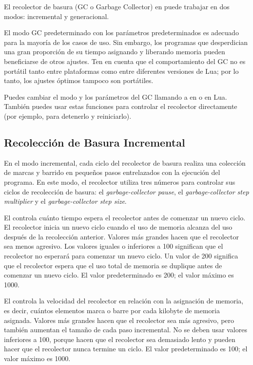 El recolector de basura (GC o Garbage Collector) en  puede trabajar en dos modos: incremental y generacional.

El modo GC predeterminado con los parámetros predeterminados es adecuado para la mayoría de los casos de uso. Sin embargo, los programas que desperdician una gran proporción de su tiempo asignando y liberando memoria pueden beneficiarse de otros ajustes. Ten en cuenta que el comportamiento del GC no es portátil tanto entre plataformas como entre diferentes versiones de Lua; por lo tanto, los ajustes óptimos tampoco son portátiles.

Puedes cambiar el modo y los parámetros del GC llamando a  en  o  en Lua. También puedes usar estas funciones para controlar el recolector directamente (por ejemplo, para detenerlo y reiniciarlo).

\subsection{Recolección de Basura Incremental}

En el modo incremental, cada ciclo del recolector de basura realiza una colección de marcas y barrido en pequeños pasos entrelazados con la ejecución del programa. En este modo, el recolector utiliza tres números para controlar sus ciclos de recolección de basura: el \textit{garbage-collector pause}, el \textit{garbage-collector step multiplier} y el \textit{garbage-collector step size}.

El  controla cuánto tiempo espera el recolector antes de comenzar un nuevo ciclo. El recolector inicia un nuevo ciclo cuando el uso de memoria alcanza  del uso después de la recolección anterior. Valores más grandes hacen que el recolector sea menos agresivo. Los valores iguales o inferiores a 100 significan que el recolector no esperará para comenzar un nuevo ciclo. Un valor de 200 significa que el recolector espera que el uso total de memoria se duplique antes de comenzar un nuevo ciclo. El valor predeterminado es 200; el valor máximo es 1000.

El  controla la velocidad del recolector en relación con la asignación de memoria, es decir, cuántos elementos marca o barre por cada kilobyte de memoria asignada. Valores más grandes hacen que el recolector sea más agresivo, pero también aumentan el tamaño de cada paso incremental. No se deben usar valores inferiores a 100, porque hacen que el recolector sea demasiado lento y pueden hacer que el recolector nunca termine un ciclo. El valor predeterminado es 100; el valor máximo es 1000.


